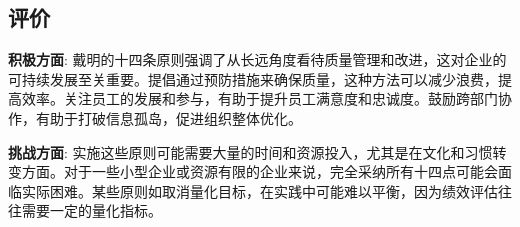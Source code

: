 \documentclass[UTF8,a4paper]{ctexart}
\begin{document}
	\subsection{评价}
	\textbf{积极方面}:
  	戴明的十四条原则强调了从长远角度看待质量管理和改进，这对企业的可持续发展至关重要。提倡通过预防措施来确保质量，这种方法可以减少浪费，提高效率。关注员工的发展和参与，有助于提升员工满意度和忠诚度。鼓励跨部门协作，有助于打破信息孤岛，促进组织整体优化。

	\textbf{挑战方面}:
  	实施这些原则可能需要大量的时间和资源投入，尤其是在文化和习惯转变方面。对于一些小型企业或资源有限的企业来说，完全采纳所有十四点可能会面临实际困难。某些原则如取消量化目标，在实践中可能难以平衡，因为绩效评估往往需要一定的量化指标。

	\newpage




	


	


\end{document}
